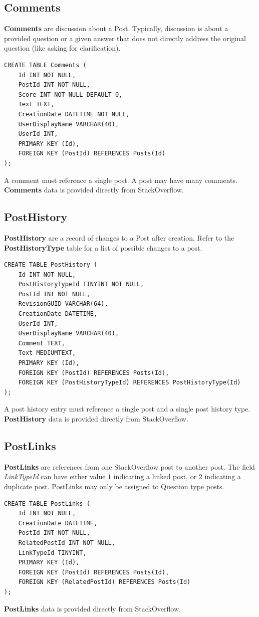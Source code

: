 \documentclass[a4paper,11pt, notitlepage]{report}
\theoremstyle{definition}
\numberwithin{equation}{section}		%
\begin{document}
\subsection{Comments}
\textbf{Comments} are discussion about a Post. Typically, discussion is about a provided question or a given answer that does not directly address the original question (like asking for clarification).
\begin{lstlisting}
CREATE TABLE Comments (
    Id INT NOT NULL,
    PostId INT NOT NULL,
    Score INT NOT NULL DEFAULT 0,
    Text TEXT,
    CreationDate DATETIME NOT NULL,
    UserDisplayName VARCHAR(40),
    UserId INT,
    PRIMARY KEY (Id),
    FOREIGN KEY (PostId) REFERENCES Posts(Id)
);
\end{lstlisting}
A comment must reference a single post. A post may have many comments. \textbf{Comments} data is provided directly from StackOverflow.

\subsection{PostHistory}
\textbf{PostHistory} are a record of changes to a Post after creation. Refer to the \textbf{PostHistoryType} table for a list of possible changes to a post.
\begin{lstlisting}
CREATE TABLE PostHistory (
    Id INT NOT NULL,
    PostHistoryTypeId TINYINT NOT NULL,
    PostId INT NOT NULL,
    RevisionGUID VARCHAR(64),
    CreationDate DATETIME,
    UserId INT,
    UserDisplayName VARCHAR(40),
    Comment TEXT,
    Text MEDIUMTEXT,
    PRIMARY KEY (Id),
    FOREIGN KEY (PostId) REFERENCES Posts(Id),
    FOREIGN KEY (PostHistoryTypeId) REFERENCES PostHistoryType(Id)
);
\end{lstlisting}
A post history entry must reference a single post and a single post history type. \textbf{PostHistory} data is provided directly from StackOverflow.

\subsection{PostLinks}
\textbf{PostLinks} are references from one StackOverflow post to another post. The field \textit{LinkTypeId} can have either value $1$ indicating a linked post, or $2$ indicating a duplicate post. PostLinks may only be assigned to Question type posts.
\begin{lstlisting}
CREATE TABLE PostLinks (
    Id INT NOT NULL,
    CreationDate DATETIME,
    PostId INT NOT NULL,
    RelatedPostId INT NOT NULL,
    LinkTypeId TINYINT,
    PRIMARY KEY (Id),
    FOREIGN KEY (PostId) REFERENCES Posts(Id),
    FOREIGN KEY (RelatedPostId) REFERENCES Posts(Id)
);
\end{lstlisting}
\textbf{PostLinks} data is provided directly from StackOverflow.
\end{document}

